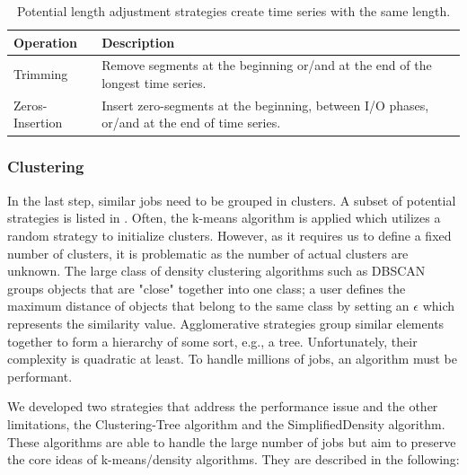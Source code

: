 \documentclass{jhps}
\begin{document}
\begin{table}
  \centering
    \begin{tabularx}{\textwidth}{lX}
      Operation       & Description                                                                                  \\
      \midrule
      Trimming        & Remove segments at the beginning or/and at the end of the longest time series. \\
      Zeros-Insertion & Insert zero-segments at the beginning, between I/O phases, or/and at the end of time series. \\
    \end{tabularx}
    \caption{Potential length adjustment strategies create time series with the same length.}
  \label{tab:matching_strategies}
\end{table}

\subsubsection{Clustering}
In the last step, similar jobs need to be grouped in clusters.
A subset of potential strategies is listed in .
Often, the k-means algorithm is applied which utilizes a random strategy to initialize clusters.
However, as it requires us to define a fixed number of clusters, it is problematic as the number of actual clusters are unknown.
The large class of density clustering algorithms such as DBSCAN groups objects that are "close" together into one class; a user defines the maximum distance of objects that belong to the same class by setting an $\epsilon$ which represents the similarity value.
Agglomerative strategies group similar elements together to form a hierarchy of some sort, e.g., a tree.
Unfortunately, their complexity is quadratic at least.
To handle millions of jobs, an algorithm must be performant.

We developed two strategies that address the performance issue and the other limitations, the Clustering-Tree algorithm and the SimplifiedDensity algorithm.
These algorithms are able to handle the large number of jobs but aim to preserve the core ideas of k-means/density algorithms.
They are described in the following:
\end{document}
